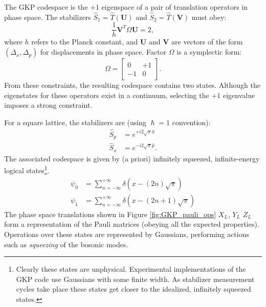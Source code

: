 The GKP codespace is the $+1$ eigenspace of a pair of translation operators in phase space. The stabilizers $\hat{S}_1=\hat{T}(\mathbf{U})$ and $\hat{S}_2=\hat{T}(\mathbf{V})$ must obey:
\begin{equation}
    \frac{1}{h}\mathbf{V}^T\Omega\mathbf{U}=2,
\end{equation}
where $h$ refers to the Planck constant, and $\mathbf{U}$ and $\mathbf{V}$ are vectors of the form $(\Delta_x,\Delta_p)$ for displacements in phase space. Factor $\Omega$ is a symplectic form:
\begin{equation}
    \Omega=\begin{bmatrix}
        0 &+1\\
        -1& 0
    \end{bmatrix}.
\end{equation}
From these constraints, the resulting codespace contains two states. Although the eigenstates for these operators exist in a continuum, selecting the $+1$ eigenvalue imposes a strong constraint.

For a square lattice, the stabilizers are (using $\hslash=1$ convention):
\begin{eqnarray}
    \hat{S}_p&=e^{+i2\sqrt{\pi}\hat{x}}\\
    \hat{S}_x&=e^{-i2\sqrt{\pi}\hat{p}}.
\end{eqnarray}
The associated codespace is given by (a priori) infinitely squeezed, infinite-energy logical states\footnote{Clearly these states are unphysical. Experimental implementations of the GKP code use Gaussians with some finite width. As stabilizer measurement cycles take place these states get closer to the idealized, infinitely squeezed states.}.
\begin{eqnarray}
    \psi_0&=\sum_{n=-\infty}^{+\infty} \delta(x-(2n)\sqrt{\pi})\\
    \psi_1&=\sum_{n=-\infty}^{+\infty} \delta(x-(2n+1)\sqrt{\pi})
\end{eqnarray}
The phase space translations shown in Figure \ref{fig:GKP_pauli_ops} $X_L$, $Y_L$ $Z_L$ form a representation of the Pauli matrices (obeying all the expected properties). Operations over these states are represented by Gaussians, performing actions such as \textit{squeezing} of the bosonic modes.

